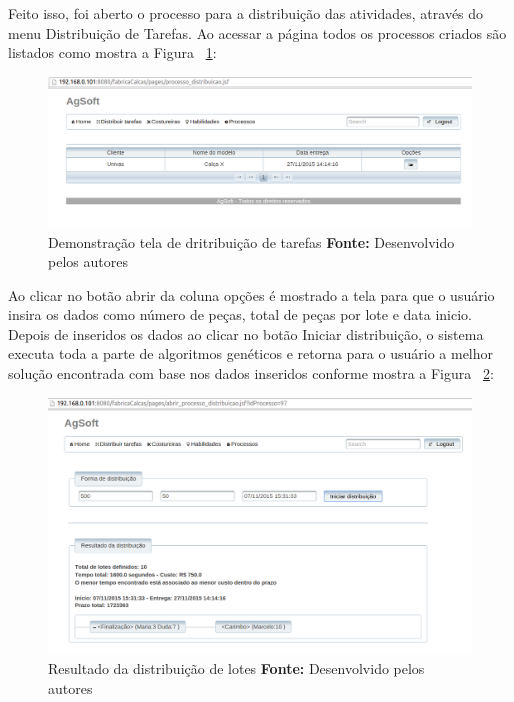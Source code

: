 \par Feito isso, foi aberto o processo para a distribuição
das atividades, através do menu Distribuição de Tarefas.
Ao acessar a página todos os processos criados são
listados como mostra a Figura ~\ref{fig:distribuicao_tarefas}:

\begin{figure}[h!]
	\centerline{\includegraphics[scale=0.4]{./imagens/tela_distribuicao_tarefas.png}}
	\caption[Demonstração tela de dritribuição de tarefas]
	{Demonstração tela de dritribuição de tarefas \textbf{Fonte:} Desenvolvido pelos autores}
	\label{fig:distribuicao_tarefas}
\end{figure}


\par Ao clicar no botão abrir da coluna opções é mostrado a tela para que o
usuário insira os dados como número de peças, total de peças por lote e data inicio. Depois de
inseridos os dados ao clicar no botão Iniciar distribuição, o sistema executa
toda a parte de algoritmos genéticos e retorna para o usuário a melhor solução
encontrada com base nos dados inseridos conforme mostra a Figura ~\ref{fig:resultado_distribuicao_teste1}:


\begin{figure}[h!]
	\centerline{\includegraphics[scale=0.4]{./imagens/resultado_distribuicao_teste1.png}}
	\caption[Resultado da distribuição de lotes]
	{Resultado da distribuição de lotes \textbf{Fonte:} Desenvolvido pelos autores}
	\label{fig:resultado_distribuicao_teste1}
\end{figure}

